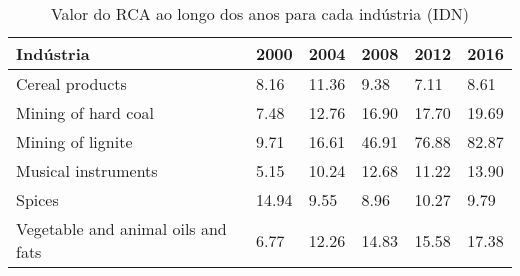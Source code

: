 \begin{table}
\centering
\caption{Valor do RCA ao longo dos anos para cada indústria (IDN)}
\label{tab:ex3-tempo-IDN}
\begin{tabular}{p{6cm}p{1.5cm}p{1.5cm}p{1.5cm}p{1.5cm}p{1.5cm}}
\toprule
                         Indústria &  2000 &  2004 &  2008 &  2012 &  2016 \\
\midrule
                   Cereal products &  8.16 & 11.36 &  9.38 &  7.11 &  8.61 \\
               Mining of hard coal &  7.48 & 12.76 & 16.90 & 17.70 & 19.69 \\
                 Mining of lignite &  9.71 & 16.61 & 46.91 & 76.88 & 82.87 \\
               Musical instruments &  5.15 & 10.24 & 12.68 & 11.22 & 13.90 \\
                            Spices & 14.94 &  9.55 &  8.96 & 10.27 &  9.79 \\
Vegetable and animal oils and fats &  6.77 & 12.26 & 14.83 & 15.58 & 17.38 \\
\bottomrule
\end{tabular}
\end{table}
